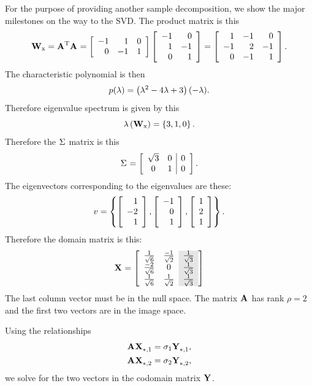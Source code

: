 For the purpose of providing another sample decomposition, we show the major milestones on the way to the SVD. The product matrix is this
\begin{equation}
  \W{x} = \A{T}\A{} =
  \mat{rrr}{-1&1&0\\0&-1&1}
  \mat{rr}{-1&0\\1&-1\\0&1} =
  \mat{rrr}{1&-1&0\\-1&2&-1\\0&-1&1}.
\end{equation}
The characteristic polynomial is then
\begin{equation}
  p(\lambda) = \paren{\lambda^{2}-4\lambda+3}(-\lambda).
\end{equation}
Therefore eigenvalue spectrum is given by this
\begin{equation}
  \lambda\paren{\W{x}} = \lst{3,1,0}.
\end{equation}
Therefore the $\sig{}$ matrix is this
\begin{equation}
  \sig{} = \mat{cc|c}{\sqrt{3}&0&0\\0&1&0}.
\end{equation}
The eigenvectors corresponding to the eigenvalues are these:
\begin{equation}
  v = \lst{
  \mat{r}{1\\-2\\1},
  \mat{r}{-1\\0\\1},
  \mat{r}{1\\2\\1}}.
\end{equation}
Therefore the domain matrix is this:
\begin{equation}
  \X{} = \mat{cc>{\columncolor{ltgray}}c}
  {\ssix & \frac{-1}{\sqrt{2}} & \sthree\\
   \frac{-2}{\sqrt{6}} & 0     & \sthree\\
   \ssix    & \stwo            & \sthree}
\end{equation}
The last column vector must be in the null space. The matrix $\A{}$ has rank $\rho=2$ and the first two vectors are in the image space.

Using the relationships
\begin{equation}
  \begin{split}
    \A{}\X{}_{*,1} &= \sigma_{1}\Y{}_{*,1},\\
    \A{}\X{}_{*,2} &= \sigma_{2}\Y{}_{*,2},
  \end{split}
\end{equation}
we solve for the two vectors in the codomain matrix $\Y{}$.

